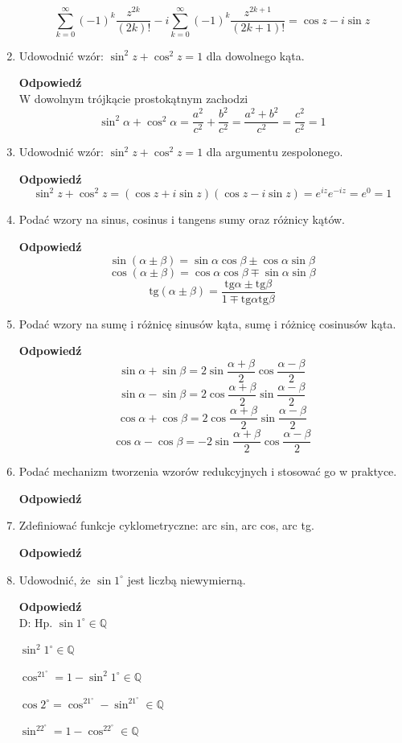 \documentclass[12pt,a4paper]{article}
\theoremstyle{break}
\newcommand{\Odp}[1]{
		\begin{mdframed}[style=zadanie]
			\textbf{Odpowiedź}\\
			#1
		\end{mdframed}
	}
\newcommand{\tg}{\text{tg}}
\begin{document}
\begin{enumerate}[1.]
{		$$\sum_{k=0}^{\infty}(-1)^{k}\frac{z^{2k}}{(2k)!}-i\sum_{k=0}^{\infty}(-1)^{k}\frac{z^{2k+1}}{(2k+1)!}=\cos z - i\sin z$$
		
	}
	
	\item Udowodnić wzór: $\sin^2 z + \cos^2 z = 1$ dla dowolnego kąta.
	\Odp{
		W dowolnym trójkącie prostokątnym zachodzi
		$$\sin^2\alpha+\cos^2\alpha=\frac{a^2}{c^2}+\frac{b^2}{c^2}=\frac{a^2+b^2}{c^2}=\frac{c^2}{c^2}=1$$	
	}
	
	\item Udowodnić wzór: $\sin^2 z + \cos^2 z = 1$ dla argumentu zespolonego.
	\Odp{
		$$\sin^2z+\cos^2z = (\cos z+i\sin z)(\cos z-i\sin z)=e^{iz}e^{-iz}=e^0=1$$
	}
	
	\item Podać wzory na sinus, cosinus i tangens sumy oraz różnicy kątów.
	\Odp{
		$$\sin(\alpha\pm\beta)=\sin\alpha\cos\beta\pm\cos\alpha\sin\beta$$
		$$\cos(\alpha\pm\beta)=\cos\alpha\cos\beta\mp\sin\alpha\sin\beta$$
		$$\tg(\alpha\pm\beta)=\frac{\tg\alpha\pm\tg\beta}{1\mp\tg\alpha\tg\beta}$$
	}
	
	\item Podać wzory na sumę i różnicę sinusów kąta, sumę i różnicę cosinusów kąta.
	\Odp{
		$$\sin\alpha+\sin\beta=2\sin\frac{\alpha+\beta}{2}\cos\frac{\alpha-\beta}{2}$$
		$$\sin\alpha-\sin\beta=2\cos\frac{\alpha+\beta}{2}\sin\frac{\alpha-\beta}{2}$$
		$$\cos\alpha+\cos\beta=2\cos\frac{\alpha+\beta}{2}\sin\frac{\alpha-\beta}{2}$$
		$$\cos\alpha-\cos\beta=-2\sin\frac{\alpha+\beta}{2}\cos\frac{\alpha-\beta}{2}$$
	}
	
	\item Podać mechanizm tworzenia wzorów redukcyjnych i stosować go w praktyce.
	\Odp{
		
	}
	
	\item Zdeﬁniować funkcje cyklometryczne: arc sin, arc cos, arc tg.
	\Odp{
		
	}
	
	\item Udowodnić, że $\sin 1^\circ$ jest liczbą niewymierną.
	\Odp{
		D: Hp. $\sin 1^\circ \in \mathbb{Q}$
		
		$\sin^2 1^\circ \in \mathbb{Q}$
		
		$\cos^21^\circ = 1- \sin^2 1^\circ \in \mathbb{Q}$
		
		$\cos 2^\circ = \cos^21^\circ - \sin^21^\circ \in \mathbb{Q}$
		
		$\sin^22^\circ = 1-\cos^22^\circ \in \mathbb{Q}$
		
}
\end{enumerate}
\end{document}
